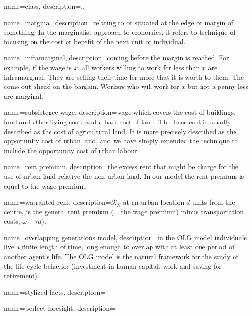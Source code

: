 

{
name=class,
description={.. }
}

{
name=marginal,
description={relating to or situated at the edge or margin of something. In the marginalist approach to economics, it  refers to technique of focusing on the cost or benefit of the next unit or individual.}
}

{
name=inframarginal,
description={coming before the margin is reached. For example, if the wage is $x$, all workers willing to work for less than $x$ are inframarginal. They are selling their time for more that it is worth to them. The come out ahead on the bargain. Workers who will work for $x$ but not a penny less are marginal. }
}

{
name=subsistence wage,
description={wage which covers the cost of buildings, food and other living costs and a base cost of land. This base cost is usually described as the cost of agricultural land. It is more precisely described as the opportunity cost of urban land, and we have simply extended the technique to include the opportunity cost of urban labour. }
}

{
name=rent premium,
description={the excess rent  that might be charge for the use of urban land relative the non-urban land. In our model the rent premium is equal to the wage premium. }
}

{
name=warranted rent,
description={$\mathcal{R}_N$ at an  urban location  $d$ units from the centre, is the general rent premium (= the wage premium) minus transportation costs, $\omega-\tau d$).  }
}


{
name=overlapping generations model,
description={in the OLG model individuals live a finite length of time, long enough to overlap with at least one period of another agent's life. The OLG model is the natural framework for the study of the life-cycle behavior (investment in human capital, work and saving for retirement).}
}

{
name=stylized facts,
description={ }
}

{
name=perfect foresight,
description={ }
}

